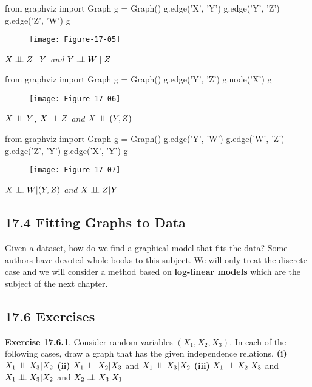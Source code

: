 \begin{python}
from graphviz import Graph
g = Graph()
g.edge('X', 'Y')
g.edge('Y', 'Z')
g.edge('Z', 'W')
g
\end{python}

\begin{figure}[H]
\centering
\texttt{[image: Figure-17-05]}
\end{figure}

\emph{\(X \perp\!\!\!\perp Z \;|\; Y\) and \(Y \perp\!\!\!\perp W \;|\; Z\)}

\begin{python}
from graphviz import Graph
g = Graph()
g.edge('Y', 'Z')
g.node('X')
g
\end{python}

\begin{figure}[H]
\centering
\texttt{[image: Figure-17-06]}
\end{figure}

\emph{\(X \perp\!\!\!\perp Y\), \(X \perp\!\!\!\perp Z\) and
\(X \perp\!\!\!\perp (Y, Z)\)}

\begin{python}
from graphviz import Graph
g = Graph()
g.edge('Y', 'W')
g.edge('W', 'Z')
g.edge('Z', 'Y')
g.edge('X', 'Y')
g
\end{python}

\begin{figure}[H]
\centering
\texttt{[image: Figure-17-07]}
\end{figure}

\emph{\(X \perp\!\!\!\perp W | (Y, Z)\) and \(X \perp\!\!\!\perp Z | Y\)}

\subsection*{17.4 Fitting Graphs to Data}\label{fitting-graphs-to-data}
Given a dataset, how do we find a graphical model that fits the data?
Some authors have devoted whole books to this subject. We will only
treat the discrete case and we will consider a method based on
\textbf{log-linear models} which are the subject of the next chapter.

\subsection*{17.6 Exercises}

\textbf{Exercise 17.6.1}. Consider random variables \((X_{1}, X_{2}, X_{3})\).
In each of the following cases, draw a graph that has the given
independence relations.
\textbf{(i)} \(X_{1} \perp\!\!\!\perp X_{3} | X_{2}\)
\textbf{(ii)} \(X_{1} \perp\!\!\!\perp X_{2} | X_{3}\) and
\(X_{1} \perp\!\!\!\perp X_{3} | X_{2}\)
\textbf{(iii)} \(X_{1} \perp\!\!\!\perp X_{2} | X_{3}\) and
\(X_{1} \perp\!\!\!\perp X_{3} | X_{2}\) and \(X_{2} \perp\!\!\!\perp X_{3} | X_{1}\)

